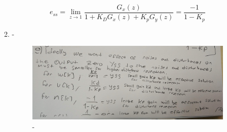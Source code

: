 \documentclass[a4paper,12pt]{article}
\begin{document}
\begin{enumerate}
\begin{enumerate}
	$$ e_{ss}=\lim_{ z \to 1}\frac{G_x(z)}{1+K_DG_x(z)+K_pG_y(z)}=\frac{-1}{1-K_p}$$

	\item -
	
	\begin{figure}[H]
			\center
			\setlength{\unitlength}{\textwidth} 
		\includegraphics[width=1.0\unitlength]{images/son}
  		\caption{\label{fig:a}-}
	\end{figure}
	
	
	
	\end{enumerate}
		 	
\end{enumerate}
	

				

% 
\end{document}
